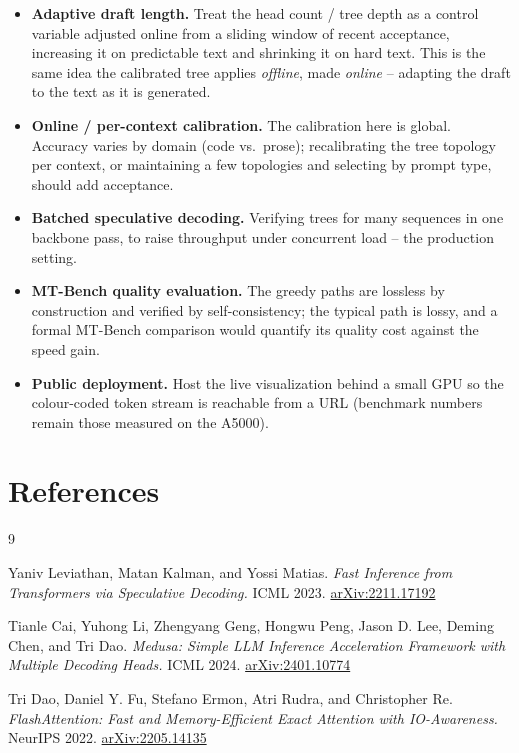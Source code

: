 \documentclass[12pt, a4paper]{article}
\begin{document}
\begin{itemize}
    \item \textbf{Adaptive draft length.} Treat the head count / tree depth as a control
          variable adjusted online from a sliding window of recent acceptance, increasing it
          on predictable text and shrinking it on hard text. This is the same idea the
          calibrated tree applies \emph{offline}, made \emph{online} -- adapting the draft to
          the text as it is generated.
    \item \textbf{Online / per-context calibration.} The calibration here is global. Accuracy
          varies by domain (code vs.\ prose); recalibrating the tree topology per context, or
          maintaining a few topologies and selecting by prompt type, should add acceptance.
    \item \textbf{Batched speculative decoding.} Verifying trees for many sequences in one
          backbone pass, to raise throughput under concurrent load -- the production setting.
    \item \textbf{MT-Bench quality evaluation.} The greedy paths are lossless by construction
          and verified by self-consistency; the typical path is lossy, and a formal MT-Bench
          comparison would quantify its quality cost against the speed gain.
    \item \textbf{Public deployment.} Host the live visualization behind a small GPU so the
          colour-coded token stream is reachable from a URL (benchmark numbers remain those
          measured on the A5000).
\end{itemize}

\section{References}

\begin{thebibliography}{9}

Yaniv Leviathan, Matan Kalman, and Yossi Matias.
\textit{Fast Inference from Transformers via Speculative Decoding.}
ICML 2023. \href{https://arxiv.org/abs/2211.17192}{arXiv:2211.17192}

Tianle Cai, Yuhong Li, Zhengyang Geng, Hongwu Peng, Jason D. Lee,
Deming Chen, and Tri Dao.
\textit{Medusa: Simple LLM Inference Acceleration Framework with
Multiple Decoding Heads.}
ICML 2024. \href{https://arxiv.org/abs/2401.10774}{arXiv:2401.10774}

Tri Dao, Daniel Y. Fu, Stefano Ermon, Atri Rudra, and Christopher Re.
\textit{FlashAttention: Fast and Memory-Efficient Exact Attention
with IO-Awareness.}
NeurIPS 2022. \href{https://arxiv.org/abs/2205.14135}{arXiv:2205.14135}

\end{thebibliography}
\end{document}

